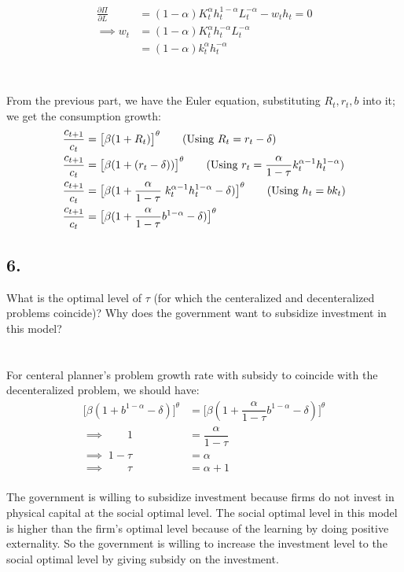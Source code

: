 \documentclass[12pt]{extarticle}
\def\secondarycolor{Golden}
\newcommand{\problem}[1]{
    \subsection*{\textcolor{\secondarycolor}{#1}}
    \addcontentsline{toc}{subsection}{\protect\numberline{}#1}
}
\newcommand{\rond}[2]{\frac{\partial #1}{\partial #2}}
\begin{document}
\begin{align*}
    \rond{\Pi}{L} &= (1-\alpha) K_t^{\alpha}h_t^{1-\alpha}L_t^{-\alpha} - w_t h_t = 0\\
    \implies  w_t &= (1-\alpha)K_t^{\alpha}h_t^{-\alpha}L_t^{-\alpha}\\
    &= (1-\alpha)k_t^{\alpha}h_t^{-\alpha}\\
\end{align*}\\\\
From the previous part, we have the Euler equation, substituting $R_t,r_t,b$ into it; we get the consumption growth:\\
\begin{align*}
    \frac{c_{t+1}}{c_t} &= \bigl[\beta (1 + R_t)\bigr]^{\theta} \tag{Using $R_t = r_t - \delta$}\\
    \frac{c_{t+1}}{c_t} &= \bigl[\beta (1 + (r_t - \delta))\bigr]^{\theta} \tag{Using $r_t = \dfrac{\alpha}{1-\tau} k_t^{\alpha-1} h_t^{1-\alpha}$}\\
    \frac{c_{t+1}}{c_t} &= \bigl[\beta (1 + \dfrac{\alpha}{1-\tau}\;k_t^{\alpha-1} h_t^{1-\alpha} - \delta)\bigr]^{\theta} \tag{Using $h_t = b k_t$}\\
    \frac{c_{t+1}}{c_t} &= \bigl[\beta (1 + \dfrac{\alpha}{1-\tau} b^{1-\alpha} - \delta)\bigr]^{\theta}\\
\end{align*}

\newpage
\problem{6.}What is the optimal level of $\tau$ (for which the centeralized and decenteralized problems coincide)? Why does
the government want to subsidize investment in this model?\\\\\\
For centeral planner's problem growth rate with subsidy to coincide with the decenteralized problem, we should have:
\begin{align*}
    \bigl[\beta(1 + b^{1-\alpha} - \delta)\bigr]^{\theta}  &=  \bigl[\beta (1 + \dfrac{\alpha}{1-\tau} b^{1-\alpha} - \delta)\bigr]^{\theta}\\
    \implies \qquad 1  &=  \dfrac{\alpha}{1-\tau}\\ 
    \implies  \;1-\tau  &=  \alpha\\
    \implies  \qquad \tau  &=  \alpha +1 
\end{align*}\\

The government is willing to subsidize investment because firms do not invest in physical capital at the social optimal level.
The social optimal level in this model is higher than the firm's optimal level because of the learning by doing positive externality.
So the government is willing to increase the investment level to the social optimal level by giving subsidy on the investment.


\end{document}
